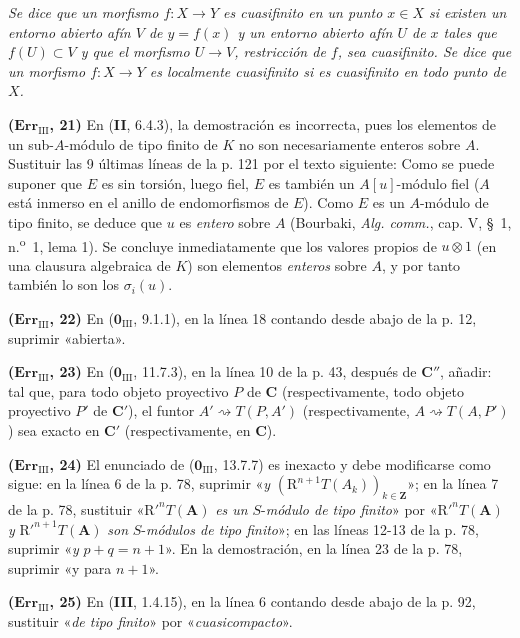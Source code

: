 \documentclass[10pt,oneside]{book}
\begin{document}
\emph{Se dice que un morfismo $f:X\to Y$ es cuasifinito en un punto $x\in X$
si existen un entorno abierto afín $V$ de $y=f(x)$ y un entorno abierto afín
$U$ de $x$ tales que $f(U)\subset V$ y que el morfismo $U\to V$, restricción de
$f$, sea cuasifinito. Se dice que un morfismo $f:X\to Y$ es localmente
cuasifinito si es cuasifinito en todo punto de $X$.}

\noindent\textbf{($\mathbf{Err}_{\mathrm{III}}$, 21)} En (\textbf{II}, 6.4.3), la
demostración es incorrecta, pues los elementos de un sub-$A$-módulo de tipo
finito de $K$ no son necesariamente enteros sobre $A$. Sustituir las 9 últimas
líneas de la p. 121 por el texto siguiente: Como se puede suponer que $E$ es
sin torsión, luego fiel, $E$ es también un $A[u]$-módulo fiel ($A$ está
inmerso en el anillo de endomorfismos de $E$). Como $E$ es un $A$-módulo de
tipo finito, se deduce que $u$ es \emph{entero} sobre $A$ (Bourbaki,
\emph{Alg. comm.}, cap. V, \S~1, n.\textsuperscript{o}~1, lema 1). Se concluye
inmediatamente que los valores propios de $u\otimes1$ (en una clausura
algebraica de $K$) son elementos \emph{enteros} sobre $A$, y por tanto también
lo son los $\sigma_i(u)$.

\noindent\textbf{($\mathbf{Err}_{\mathrm{III}}$, 22)} En
($\mathbf 0_{\mathrm{III}}$, 9.1.1), en la línea 18 contando desde abajo de la p. 12,
suprimir «abierta».

\noindent\textbf{($\mathbf{Err}_{\mathrm{III}}$, 23)} En
($\mathbf 0_{\mathrm{III}}$, 11.7.3), en la línea 10 de la p. 43, después de
$\boldsymbol C''$, añadir: tal que, para todo objeto proyectivo $P$ de
$\boldsymbol C$ (respectivamente, todo objeto proyectivo $P'$ de $\boldsymbol C'$),
el funtor $A'\rightsquigarrow T(P,A')$ (respectivamente,
$A\rightsquigarrow T(A,P')$) sea exacto en $\boldsymbol C'$ (respectivamente, en
$\boldsymbol C$).

\noindent\textbf{($\mathbf{Err}_{\mathrm{III}}$, 24)} El enunciado de
($\mathbf 0_{\mathrm{III}}$, 13.7.7) es inexacto y debe modificarse como sigue: en la
línea 6 de la p. 78, suprimir «\emph{y}
$(\mathrm R^{n+1}T(A_k))_{k\in\mathbf Z}$»; en la línea 7 de la p. 78, sustituir
«$\mathrm R'^nT(\mathbf A)$ \emph{es un} $S$-\emph{módulo de tipo finito}» por
«$\mathrm R'^nT(\mathbf A)$ \emph{y} $\mathrm R'^{n+1}T(\mathbf A)$ \emph{son} $S$-\emph{módulos de tipo finito}»;
en las líneas 12-13 de la p. 78, suprimir «\emph{y} $p+q=n+1$». En la demostración,
en la línea 23 de la p. 78, suprimir «y para $n+1$».

\noindent\textbf{($\mathbf{Err}_{\mathrm{III}}$, 25)} En (\textbf{III}, 1.4.15), en
la línea 6 contando desde abajo de la p. 92, sustituir «\emph{de tipo finito}»
por «\emph{cuasicompacto}».
\end{document}
